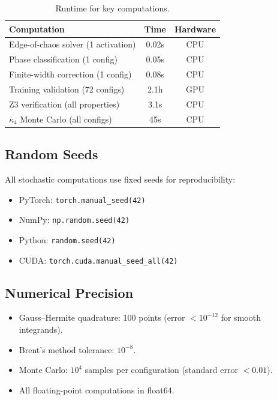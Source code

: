 \documentclass[10pt]{article}
\begin{document}
\begin{table}[h]
\centering
\caption{Runtime for key computations.}
\label{tab:runtime}
\small
\begin{tabular}{@{}lcc@{}}
\toprule
\textbf{Computation} & \textbf{Time} & \textbf{Hardware} \\
\midrule
Edge-of-chaos solver (1 activation) & 0.02s & CPU \\
Phase classification (1 config) & 0.05s & CPU \\
Finite-width correction (1 config) & 0.08s & CPU \\
Training validation (72 configs) & 2.1h & GPU \\
Z3 verification (all properties) & 3.1s & CPU \\
$\kappa_4$ Monte Carlo (all configs) & 45s & CPU \\
\bottomrule
\end{tabular}
\end{table}

\subsection{Random Seeds}

All stochastic computations use fixed seeds for reproducibility:
\begin{itemize}[nosep]
    \item PyTorch: \texttt{torch.manual\_seed(42)}
    \item NumPy: \texttt{np.random.seed(42)}
    \item Python: \texttt{random.seed(42)}
    \item CUDA: \texttt{torch.cuda.manual\_seed\_all(42)}
\end{itemize}

\subsection{Numerical Precision}

\begin{itemize}[nosep]
    \item Gauss--Hermite quadrature: 100 points (error $< 10^{-12}$ for smooth integrands).
    \item Brent's method tolerance: $10^{-8}$.
    \item Monte Carlo: $10^4$ samples per configuration (standard error $< 0.01$).
    \item All floating-point computations in float64.
\end{itemize}
\end{document}
